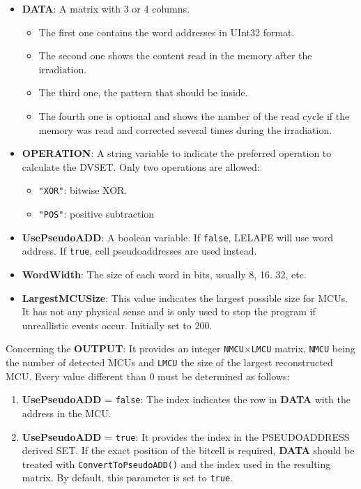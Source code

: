 \begin{itemize}
	 \begin{itemize}
	 	\item \textbf{DATA}: A matrix with 3 or 4 columns. 
	 		\begin{itemize}
	 			\item  The first one contains the word addresses in UInt32 format.
	 			\item        The second one shows the content read in the memory after the irradiation.
	 			\item        The third one, the pattern that should be inside.
	 			\item        The fourth one is optional and shows the namber of the read cycle if the  memory was read and corrected several times during the irradiation.
	 		\end{itemize}
	 	\item \textbf{OPERATION}: A string variable to indicate the preferred operation to calculate
	 	the DVSET. Only two operations are allowed: 
 		\begin{itemize}
			\item \texttt{"XOR"}: bitwise XOR.
			\item\texttt{"POS"}: positive subtraction
		\end{itemize}
	 	\item \textbf{UsePseudoADD}: A boolean variable. If \texttt{false}, LELAPE will use word address. If \texttt{true}, cell pseudoaddresses are used instead.
	 	\item \textbf{WordWidth}: The size of each word in bits, usually 8, 16. 32, etc.
	 	\item \textbf{LargestMCUSize}: This value indicates the largest possible size for MCUs. It has not any physical sense
	 	and is only used to stop the program if unreallistic events occur. Initially set to 200.
	 \end{itemize}
  
	 Concerning the \textbf{OUTPUT}: It provides an integer \texttt{NMCU}\(\times\)\texttt{LMCU} matrix, \texttt{NMCU} being the number of detected MCUs and
	 \texttt{LMCU} the size of the largest reconstructed MCU. Every value different than 0 must be determined as follows:
	 \begin{enumerate}
	 	\item \textbf{UsePseudoADD} = \texttt{false}: The index indicates the row in \textbf{DATA} with the address in the MCU.
	 	\item \textbf{UsePseudoADD} = \texttt{true}: It provides the index in the PSEUDOADDRESS derived SET. If the exact position of
	 	the bitcell is required, \textbf{DATA} should be treated with \texttt{ConvertToPseudoADD()} and
	 	the index used in the resulting matrix. By default, this parameter is set to \texttt{true}.
	 \end{enumerate}
 

\end{itemize}
